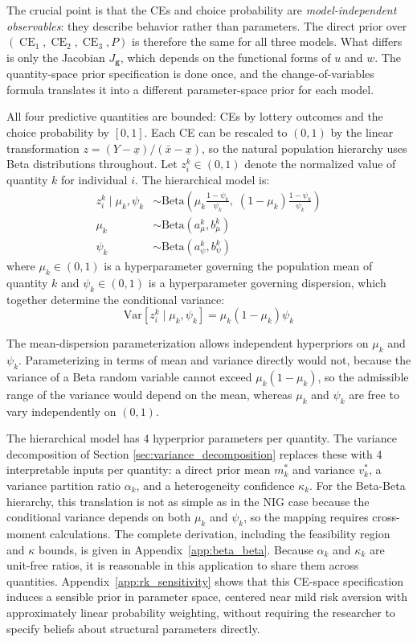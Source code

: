 \documentclass[12pt,a4paper]{article}
\theoremstyle{definition}
\theoremstyle{remark}
\DeclareMathOperator{\CE}{CE}
\newcommand{\bg}{\mathbf{g}}
\newcommand{\dpm}{m^*}
\newcommand{\dpv}{v^*}
\newcommand{\xlo}{\underline{x}}
\newcommand{\xhi}{\bar{x}}
\begin{document}
The crucial point is that the CEs and choice probability are
\textit{model-independent observables}: they describe behavior rather than
parameters. The direct prior over $(\CE_1, \CE_2, \CE_3, P)$ is therefore the
same for all three models. What differs is only the Jacobian $J_\bg$, which
depends on the functional forms of $u$ and $w$. The quantity-space prior
specification is done once, and the change-of-variables formula translates it
into a
different parameter-space prior for each model.

All four predictive quantities are bounded: CEs by lottery outcomes and the
choice probability by $[0,1]$. Each CE can be rescaled to $(0,1)$ by the
linear transformation $z = (Y - \xlo)/(\xhi - \xlo)$, so the natural
population hierarchy uses Beta distributions
throughout. Let $z_i^k \in (0,1)$ denote the normalized value of quantity $k$
for individual $i$. The hierarchical model is:
\begin{align}
  z_i^k \mid \mu_k, \psi_k
    &\sim \text{Beta}\!\left(
      \mu_k \tfrac{1 - \psi_k}{\psi_k},\;
      (1 - \mu_k) \tfrac{1 - \psi_k}{\psi_k}
    \right) \label{eq:bb_individual} \\
  \mu_k &\sim \text{Beta}(a_\mu^k, b_\mu^k)
    \label{eq:bb_mu} \\
  \psi_k &\sim \text{Beta}(a_\psi^k, b_\psi^k)
    \label{eq:bb_psi}
\end{align}
where $\mu_k \in (0,1)$ is a hyperparameter governing the population mean
of quantity $k$ and $\psi_k \in (0,1)$ is a hyperparameter governing
dispersion, which together determine the conditional variance:
\begin{equation}
  \text{Var}[z_i^k \mid \mu_k, \psi_k] = \mu_k(1 - \mu_k)\psi_k
\end{equation}

The mean-dispersion parameterization allows independent hyperpriors on $\mu_k$
and $\psi_k$. Parameterizing in terms of mean and variance directly would not,
because the variance of a Beta random variable cannot exceed
$\mu_k(1 - \mu_k)$, so the admissible range of the variance would depend on
the mean, whereas $\mu_k$ and $\psi_k$ are free to vary independently on
$(0,1)$.

The hierarchical model has 4 hyperprior parameters per quantity. The variance
decomposition of Section \ref{sec:variance_decomposition} replaces these with
4 interpretable inputs per quantity: a direct prior mean $\dpm_k$ and variance
$\dpv_k$, a variance partition ratio $\alpha_k$, and a heterogeneity confidence
$\kappa_k$. For the Beta-Beta hierarchy, this translation is not as simple as
in the NIG case because the conditional variance depends on both $\mu_k$ and
$\psi_k$, so the mapping requires cross-moment calculations. The complete
derivation, including the feasibility region and $\kappa$ bounds, is given in
Appendix~\ref{app:beta_beta}. Because $\alpha_k$ and $\kappa_k$ are unit-free
ratios, it is reasonable in this application to share them across quantities.
Appendix~\ref{app:rk_sensitivity} shows that this CE-space specification
induces a sensible prior in parameter space, centered near mild risk aversion
with approximately linear probability weighting, without requiring the
researcher to specify beliefs about structural parameters directly.
\end{document}
